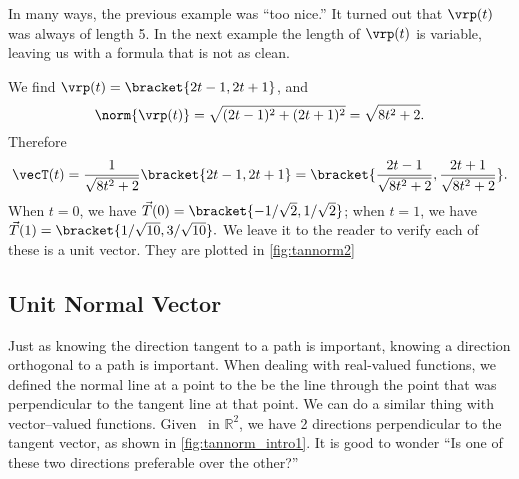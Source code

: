In many ways, the previous example was ``too nice.'' It turned out that $\vrp(t)$ was always of length 5. In the next example the length of $\vrp(t)$ is variable, leaving us with a formula that is not as clean.

{We find $\vrp(t) =\bracket{2t-1,2t+1}$, and
%
%
\[\norm{\vrp(t)} = \sqrt{(2t-1)^2+(2t+1)^2} = \sqrt{8t^2+2}.\]
Therefore
\[\vecT(t) = \frac{1}{\sqrt{8t^2+2}}\bracket{2t-1,2t+1}=\bracket{\frac{2t-1}{\sqrt{8t^2+2}},\frac{2t+1}{\sqrt{8t^2+2}}}.\]
When $t=0$, we have $\vec T(0) =\bracket{-1/\sqrt{2},1/\sqrt{2}}$; when $t=1$, we have $\vec T(1) =\bracket{1/\sqrt{10}, 3/\sqrt{10}}.$ We leave it to the reader to verify each of these is a unit vector. They are plotted in \autoref{fig:tannorm2}}

\subsection{Unit Normal Vector}

Just as knowing the direction tangent to a path is important, knowing a direction orthogonal to a path is important. When dealing with real-valued functions, we defined the normal line at a point to the be the line through the point that was perpendicular to the tangent line at that point. We can do a similar thing with vector--valued functions. Given \vrt\ in $\mathbb{R}^2$, we have 2 directions perpendicular to the tangent vector, as shown in \autoref{fig:tannorm_intro1}. It is good to wonder ``Is one of these two directions preferable over the other?''

